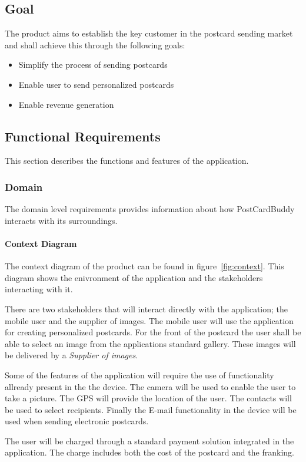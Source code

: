 \documentclass[10pt,a4paper]{article}
\begin{document}
\subsection{Goal}
The product aims to establish the key customer in the postcard sending market and shall achieve this through the following goals:

\begin{itemize}
\item Simplify the process of sending postcards
\item Enable user to send personalized postcards
\item Enable revenue generation
\end{itemize}

\subsection{Functional Requirements}
This section describes the functions and features of the application.

\subsubsection{Domain}
The domain level requirements provides information about how PostCardBuddy interacts with its surroundings. 
\paragraph{Context Diagram}
The context diagram of the product can be found in figure~\ref{fig:context}. This diagram shows the enivronment of the application and the stakeholders interacting with it.

There are two stakeholders that will interact directly with the application; the mobile user and the supplier of images. The mobile user will use the application for creating personalized postcards. For the front of the postcard the user shall be able to select an image from the applications standard gallery. These images will be delivered by a \textit{Supplier of images}.

 Some of the features of the application will require the use of functionality allready present in the the device. The camera will be used to enable the user to take a picture. The GPS will provide the location of the user. The contacts will be used to select recipients. Finally the E-mail functionality in the device will be used when sending electronic postcards.
 
The user will be charged through a standard payment solution integrated in the application. The charge includes both the cost of the postcard and the franking. 
\end{document}
